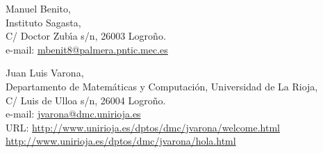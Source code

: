 \documentclass[11pt,twoside]{article}   %
\theoremstyle{plain}
\theoremstyle{definition}
\theoremstyle{remark}
\begin{document}

\vskip 6pt

\begin{flushleft} %
\noindent
{\small Manuel Benito,\\
Instituto Sagasta,\\
C/ Doctor Zub\'{\i}a s/n, 26003 Logro\~no.\\
e-mail: \href{mailto:mbenit8@palmera.pntic.mec.es}{mbenit8@palmera.pntic.mec.es}
}
\end{flushleft}

\vskip 6pt

\begin{flushleft}
{\small Juan Luis Varona,\\
Departamento de Matem\'aticas y Computaci\'on,
Universidad de La Rioja,\\
C/ Luis de Ulloa s/n, 26004 Logro\~no.\\
e-mail: \href{mailto:jvarona@dmc.unirioja.es}{jvarona@dmc.unirioja.es}\\
URL: \url{http://www.unirioja.es/dptos/dmc/jvarona/welcome.html}
\phantom{URL: }\url{http://www.unirioja.es/dptos/dmc/jvarona/hola.html}
}
\end{flushleft}
\end{document}
